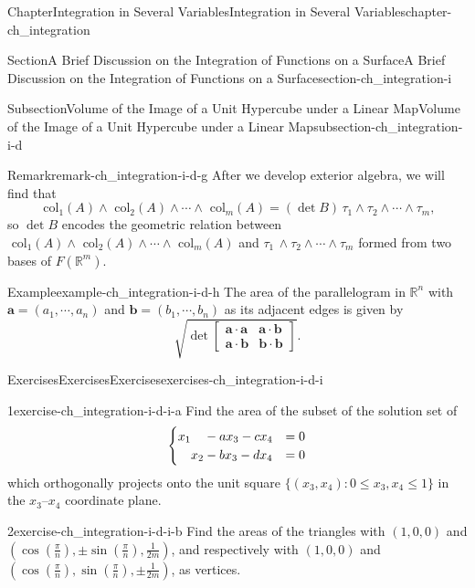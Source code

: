\documentclass[oneside,10pt,]{book}
\numberwithin{equation}{section}
\newcommand{\ba}{\mathbf{a}}
\newcommand{\bb}{\mathbf{b}}
\newcommand{\bbR}{\mathbb{R}}
\newcommand{\amp}{&}
\begin{document}
\begin{chapterptx}{Chapter}{Integration in Several Variables}{}{Integration in Several Variables}{}{}{chapter-ch_integration}
\begin{sectionptx}{Section}{A Brief Discussion on the Integration of Functions on a Surface}{}{A Brief Discussion on the Integration of Functions on a Surface}{}{}{section-ch_integration-i}
\begin{subsectionptx}{Subsection}{Volume of the Image of a Unit Hypercube under a Linear Map}{}{Volume of the Image of a Unit Hypercube under a Linear Map}{}{}{subsection-ch_integration-i-d}
\begin{remark}{Remark}{}{remark-ch_integration-i-d-g}
After we develop exterior algebra, we will find that%
\begin{equation*}
\text{ col}_1(A)\wedge \text{ col}_2(A)\wedge\cdots\wedge \text{ col}_m(A)=
\left( \det B\right)\, \tau_{1}\wedge \tau_{2}\wedge\cdots\wedge \tau_{m},
\end{equation*}
so \(\det B\) encodes the geometric relation between \(\text{ col}_1(A)\wedge \text{ col}_2(A)\wedge\cdots\wedge \text{ col}_m(A)\) and \(\tau_{1} \, \wedge \tau_{2}\wedge\cdots\wedge \tau_{m}\) formed from two bases of \(F(\bbR^{m})\).%
\end{remark}
\begin{example}{Example}{}{example-ch_integration-i-d-h}%
The area of the parallelogram in \(\bbR^{n}\) with \(\ba =(a_{1},\cdots, a_{n})\) and \(\bb =(b_{1},\cdots, b_{n})\) as its adjacent edges  is given by%
\begin{equation*}
\sqrt{\det \begin{bmatrix} \ba\cdot\ba \amp \ba \cdot \bb \\ \ba\cdot \bb \amp \bb \cdot \bb \end{bmatrix}}.
\end{equation*}
\end{example}
%
%
\typeout{************************************************}
\typeout{************************************************}
%
\begin{exercises-subsubsection-numberless}{Exercises}{Exercises}{}{Exercises}{}{}{exercises-ch_integration-i-d-i}
\begin{divisionexercise}{1}{}{}{exercise-ch_integration-i-d-i-a}%
Find the area of the subset of the solution set of%
\begin{equation*}
\begin{cases} x_{1} \hphantom{x_{2}}-a x_{3}-c x_{4} \amp =0 \\
\hphantom{x_{2}} x_{2} -b x_{3} - d x_{4} \amp =0\\
\end{cases}
\end{equation*}
which orthogonally projects onto the unit square \(\{(x_{3}, x_{4}): 0\le x_{3}, x_{4}\le 1\}\) in the \(x_{3}\mbox{--}x_{4}\) coordinate plane.%
\end{divisionexercise}%
\begin{divisionexercise}{2}{}{}{exercise-ch_integration-i-d-i-b}%
Find the areas of the triangles with \((1, 0, 0)\) and \((\cos(\frac{\pi}{n}), \pm \sin(\frac{\pi}{n}),\frac{1}{2m})\), and respectively with \((1, 0, 0)\) and \((\cos(\frac{\pi}{n}),  \sin(\frac{\pi}{n}), \pm \frac{1}{2m})\), as vertices.%

\end{divisionexercise}
\end{exercises-subsubsection-numberless}
\end{subsectionptx}
\end{sectionptx}
\end{chapterptx}
\end{document}
